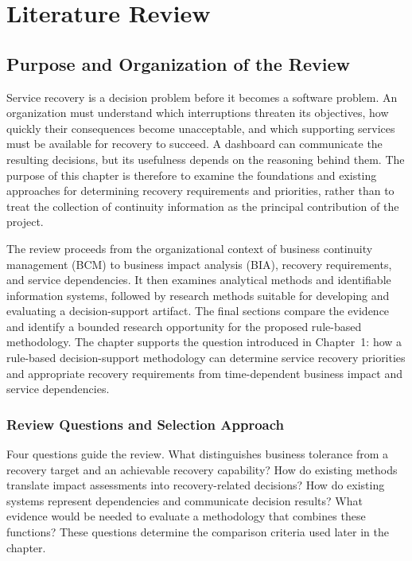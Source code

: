 \chapter{Literature Review}
\label{ch:literature-review}

\section{Purpose and Organization of the Review}

Service recovery is a decision problem before it becomes a software problem. An organization must understand which interruptions threaten its objectives, how quickly their consequences become unacceptable, and which supporting services must be available for recovery to succeed. A dashboard can communicate the resulting decisions, but its usefulness depends on the reasoning behind them. The purpose of this chapter is therefore to examine the foundations and existing approaches for determining recovery requirements and priorities, rather than to treat the collection of continuity information as the principal contribution of the project.

The review proceeds from the organizational context of business continuity management (BCM) to business impact analysis (BIA), recovery requirements, and service dependencies. It then examines analytical methods and identifiable information systems, followed by research methods suitable for developing and evaluating a decision-support artifact. The final sections compare the evidence and identify a bounded research opportunity for the proposed rule-based methodology. The chapter supports the question introduced in Chapter~1: how a rule-based decision-support methodology can determine service recovery priorities and appropriate recovery requirements from time-dependent business impact and service dependencies.

\subsection{Review Questions and Selection Approach}

Four questions guide the review. What distinguishes business tolerance from a recovery target and an achievable recovery capability? How do existing methods translate impact assessments into recovery-related decisions? How do existing systems represent dependencies and communicate decision results? What evidence would be needed to evaluate a methodology that combines these functions? These questions determine the comparison criteria used later in the chapter.

